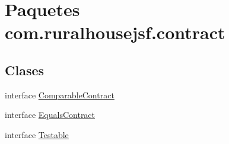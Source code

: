\hypertarget{namespacecom_1_1ruralhousejsf_1_1contract}{}\section{Paquetes com.\+ruralhousejsf.\+contract}
\label{namespacecom_1_1ruralhousejsf_1_1contract}
\subsection*{Clases}
\begin{DoxyCompactItemize}
\item 
interface \mbox{\hyperlink{interfacecom_1_1ruralhousejsf_1_1contract_1_1_comparable_contract}{Comparable\+Contract}}
\item 
interface \mbox{\hyperlink{interfacecom_1_1ruralhousejsf_1_1contract_1_1_equals_contract}{Equals\+Contract}}
\item 
interface \mbox{\hyperlink{interfacecom_1_1ruralhousejsf_1_1contract_1_1_testable}{Testable}}
\end{DoxyCompactItemize}
